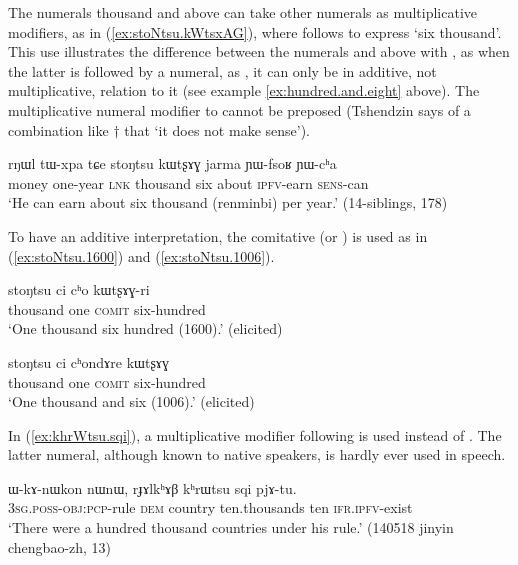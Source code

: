 The numerals thousand and above can take other numerals as multiplicative modifiers, as in (\ref{ex:stoNtsu.kWtsxAG}), where  follows   to express `six thousand'. This use illustrates the difference between the numerals  and above with , as when the latter is followed by a numeral, as , it can only be in additive, not multiplicative, relation to it (see example \ref{ex:hundred.and.eight} above). The multiplicative numeral modifier to  cannot be preposed (Tshendzin says of a combination like $\dagger$ that  `it does not make sense').

\begin{exe}
\ex  \label{ex:stoNtsu.kWtsxAG}
 \gll   rŋɯl tɯ-xpa tɕe stoŋtsu kɯtʂɤɣ jarma ɲɯ-fsoʁ ɲɯ-cʰa \\
 money one-year \textsc{lnk} thousand six about \textsc{ipfv}-earn \textsc{sens}-can \\
 \glt `He can earn about six thousand (renminbi) per year.' (14-siblings, 178)
\end{exe}
  
 To have an additive interpretation, the comitative  (or ) is used as in (\ref{ex:stoNtsu.1600}) and (\ref{ex:stoNtsu.1006}).
 
\begin{exe}
\ex  \label{ex:stoNtsu.1600}
\gll  stoŋtsu ci cʰo kɯtʂɤɣ-ri \\
 thousand one \textsc{comit} six-hundred \\
\glt `One thousand six hundred (1600).' (elicited)
\end{exe}
  
\begin{exe}
\ex  \label{ex:stoNtsu.1006}
\gll  stoŋtsu ci cʰondɤre kɯtʂɤɣ \\
 thousand one \textsc{comit} six-hundred \\
\glt `One thousand and six (1006).' (elicited)
\end{exe}

In (\ref{ex:khrWtsu.sqi}), a multiplicative modifier  following  is used instead of . The latter numeral, although known to native speakers, is hardly ever used in speech.

\begin{exe}
\ex  \label{ex:khrWtsu.sqi}
\gll ɯ-kɤ-nɯkon nɯnɯ, rɟɤlkʰɤβ kʰrɯtsu sqi pjɤ-tu. \\
 \textsc{3sg}.\textsc{poss}-\textsc{obj}:\textsc{pcp}-rule \textsc{dem} country ten.thousands ten \textsc{ifr}.\textsc{ipfv}-exist \\
\glt `There were a hundred thousand countries under his rule.' (140518 jinyin chengbao-zh, 13)
\end{exe} 


